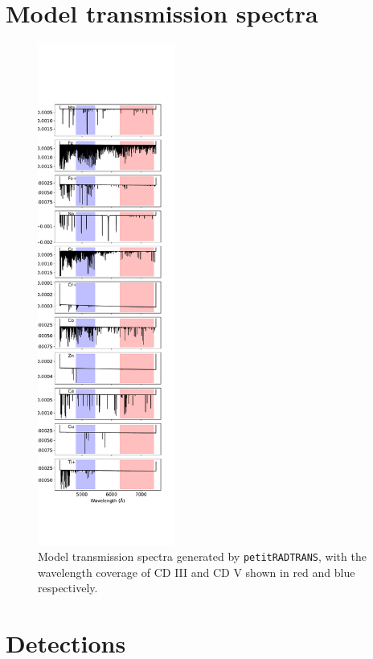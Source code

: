 \documentclass[twocolumn]{aastex631}
\newcommand{\code}[1]{\texttt{#1}}
\begin{document}
    \section{Model transmission spectra}
    \begin{figure}
        \label{fig:model-spectra-appendix}
        \includegraphics[width=0.4\textwidth]{plots-final/spectra/spectra.KELT-20b.inverted-transmission-better.pdf}
    \caption{Model transmission spectra generated by \code{petitRADTRANS}, with the wavelength coverage of CD III and CD V shown in red and blue respectively.}
            
        \end{figure}    


   \section{Detections}
\end{document}
